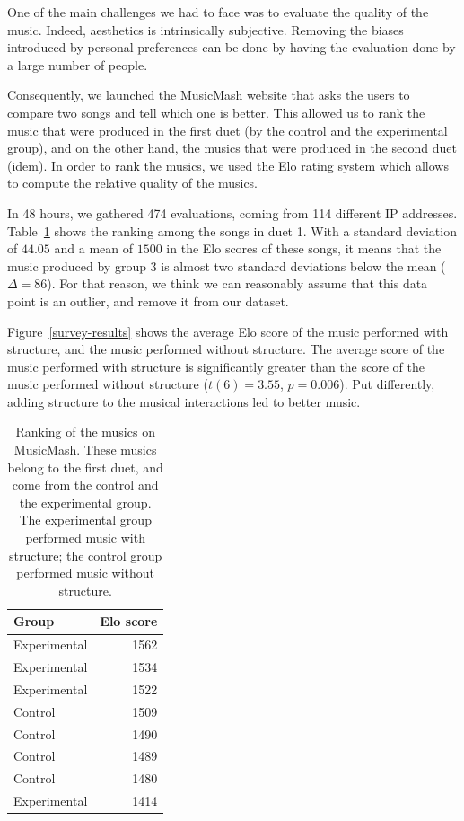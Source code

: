 \documentclass{article}
\begin{document}
One of the main challenges we had to face was to evaluate the quality of the music. Indeed, aesthetics is intrinsically subjective. Removing the biases introduced by personal preferences can be done by having the evaluation done by a large number of people.

Consequently, we launched the MusicMash website that asks the users to compare two songs and tell which one is better. This allowed us to rank the music that were produced in the first duet (by the control and the experimental group), and on the other hand, the musics that were produced in the second duet (idem). In order to rank the musics, we used the Elo rating system which allows to compute the relative quality of the musics.

In 48 hours, we gathered 474 evaluations, coming from 114 different IP addresses. Table~\ref{musicmash-results} shows the ranking among the songs in duet 1. With a standard deviation of $44.05$ and a mean of $1500$ in the Elo scores of these songs, it means that the music produced by group 3 is almost two standard deviations below the mean ($\Delta = 86$). For that reason, we think we can reasonably assume that this data point is an outlier, and remove it from our dataset.

Figure~\ref{survey-results} shows the average Elo score of the music performed with structure, and the music performed without structure. The average score of the music performed with structure is significantly greater than the score of the music performed without structure ($t(6) = 3.55$, $p = 0.006$). Put differently, adding structure to the musical interactions led to better music.

\begin{table}[tb]
\begin{center}
\begin{tabular}{l r}
Group & Elo score \\
\hline
Experimental & 1562 \\
Experimental & 1534 \\
Experimental & 1522 \\
Control & 1509 \\
Control & 1490 \\
Control & 1489 \\
Control & 1480 \\
Experimental & 1414 \\
\end{tabular}
\caption{Ranking of the musics on MusicMash. These musics belong to the first duet, and come from the control and the experimental group. The experimental group performed music with structure; the control group performed music without structure.} 
\label{musicmash-results}
\end{center}
\end{table}
\end{document}
